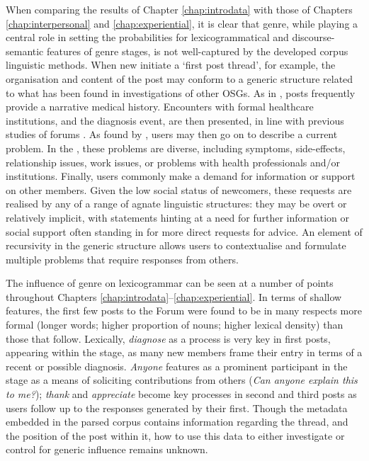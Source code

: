 When comparing the results of Chapter \ref{chap:introdata} with those of Chapters \ref{chap:interpersonal} and \ref{chap:experiential}, it is clear that genre, while playing a central role in setting the probabilities for lexicogrammatical and \gls{discourse-semantic} features of genre stages, is not well\hyp{}captured by the developed corpus linguistic methods. When new  initiate a `first \gls{post} \gls{thread}', for example, the organisation and content of the \gls{post} may conform to a generic structure related to what has been found in investigations of other \glspl{OSG}. As in \textcite{varga2014grieving}, \glspl{post} frequently provide a narrative medical history. Encounters with formal healthcare institutions, and the diagnosis event, are then presented, in line with previous studies of  \glspl{forum} \cite[e.g.][]{vayreda_social_2009}. As found by \textcite{horne_doing_2009}, users may then go on to describe a current problem. In the , these problems are diverse, including symptoms, side\hyp{}effects, relationship issues, work issues, or problems with health professionals and\slash or institutions. Finally, users commonly make a demand for information or support on other members. Given the low social status of newcomers, these requests are realised by any of a range of agnate linguistic structures: they may be overt or relatively implicit, with statements hinting at a need for further information or social support often standing in for more direct requests for advice. An element of recursivity in the generic structure allows users to contextualise and formulate multiple problems that require responses from others.

The influence of genre on lexicogrammar can be seen at a number of points throughout Chapters \ref{chap:introdata}--\ref{chap:experiential}. In terms of shallow features, the first few \glspl{post} to the \gls{Forum} were found to be in many respects more formal (longer words; higher proportion of nouns; higher lexical density) than those that follow. Lexically, \emph{diagnose} as a process is very key in first \glspl{post}, appearing within the  stage, as many new \glspl{member} frame their entry in terms of a recent or possible diagnosis. \emph{Anyone} features as a prominent participant in the  stage as a means of soliciting contributions from others (\emph{Can anyone explain this to me?}); \emph{thank} and \emph{appreciate} become key processes in second and third posts as users follow up to the responses generated by their first. Though the metadata embedded in the parsed corpus contains information regarding the \gls{thread}, and the position of the \gls{post} within it, how to use this data to either investigate or control for generic influence remains unknown.

